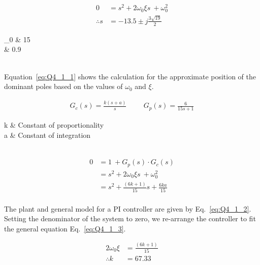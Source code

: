 \begin{equation}
\begin{split}
    0&=s^{2}+2\omega_{0}\xi s\ +\omega_{0}^{2}    \\
    \therefore s&=-13.5\pm j\frac{3\sqrt{19}}{2}
\end{split}\label{eq:Q4_1_1}
\end{equation}

\begin{conditions}
    \omega_0 & 15 \\
    \xi & 0.9 \\
\end{conditions}\\

Equation~\eqref{eq:Q4_1_1} shows the calculation for the approximate position of the dominant poles based on the values of $\omega_0$ and $\xi$.

\begin{equation}
    \begin{split}
        G_{c}\left(s\right)=\frac{k\left(s+a\right)}{s} \hspace{1cm} G_{p}\left(s\right)=\frac{6}{15s+1}
    \end{split}\label{eq:Q4_1_2}
\end{equation}

\begin{conditions}
    k & Constant of proportionality \\
    a & Constant of integration \\
\end{conditions}\\

\begin{equation}
    \begin{split}
        0&=1\ +G_{p}\left(s\right)\cdot G_{c}\left(s\right)\\
        &=s^{2}+2\omega_{0}\xi s\ +\omega_{0}^{2}\\
        &=s^{2}+\frac{\left(6k+1\right)}{15}s+\frac{6ka}{15} \\
    \end{split}\label{eq:Q4_1_3}
\end{equation}

The plant and general model for a PI controller are given by Eq.~\eqref{eq:Q4_1_2}. Setting the denominator of the system to zero, we re-arrange the controller to fit the general equation Eq.~\eqref{eq:Q4_1_3}.

\begin{equation}
    \begin{split}
        2\omega_{0}\xi &= \frac{\left(6k+1\right)}{15} \\
        \therefore k &= 67.33\\
    \end{split}\label{eq:Q4_1_4}
\end{equation}

